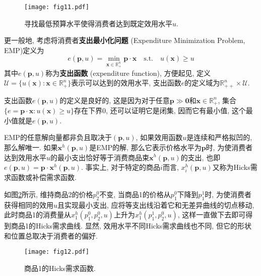 \documentclass[cn, 12pt, math=mtpro2, bibstyle=apa, blue, twocol]{elegantbook}
\newcommand{\R}{\mathbb{R}}
\newcommand{\p}{\mathbf{p}}
\newcommand{\x}{\mathbf{x}}
\begin{document}
\begin{figure}[htbp!]
  \centering
  \texttt{[image: fig11.pdf]}
  \caption{寻找最低预算水平使得消费者达到既定效用水平$u$.}\label{fig1.11}
\end{figure}

更一般地, 考虑将消费者\textbf{支出最小化问题} (Expenditure Minimization Problem, EMP)定义为
\begin{equation}\label{eq1.12}
  e(\p,u)=\min_{\x\in\R_+^n} \p\cdot\x\quad\text{s.t.}\quad u(\x)\ge u
\end{equation}
其中$e(\p,u)$称为\textbf{支出函数} (expenditure function), 方便起见, 定义$\mathcal{U}=\{u(\x):\x\in\R_+^n\}$表示可以达到的效用水平, 支出函数$e$的定义域为$\R_{++}^n\times\mathcal{U}$.

支出函数$e(\p,u)$的定义是良好的, 这是因为对于任意$\p\gg\mathbf{0}$和$\x\in\R_+^n$, 集合$\{e=\p\cdot\x: u(\x)\geq u\}$存在下界0, 还可以证明它是闭集, 因而它有最小值, 这个最小值就是$e(\p,u)$.

EMP的任意解向量都非负且取决于$(\p,u)$, 如果效用函数$u$是连续和严格拟凹的, 那么解唯一. 如果$\x^h(\p,u)$是EMP的解, 那么它表示价格水平为$\p$时, 为使消费者达到效用水平$u$的最小支出恰好等于消费商品束$\x^h(\p,u)$的支出, 也即$e(\p,u)=\p\cdot\x^h(\p,u)$. 事实上, 对于特定的商品$i$而言, $x_i^h(\p,u)$又称为Hicks需求函数或补偿需求函数.

如图\ref{fig1.12}所示, 维持商品2的价格$p_2^0$不变, 当商品1的价格从$p_1^0$下降到$p_1^1$时, 为使消费者获得相同的效用$u$且实现最小支出, 应将等支出线沿着它和无差异曲线的切点移动, 此时商品1的消费量从$x_1^h(p_1^0,p_2^0,u)$上升为$x_1^h(p_1^1,p_2^0,u)$, 这样一直做下去即可得到商品1的Hicks需求曲线. 显然, 效用水平不同Hicks需求曲线也不同, 但它的形状和位置总取决于消费者的偏好.
\begin{figure}[htbp!]
  \centering
  \texttt{[image: fig12.pdf]}
  \caption{商品1的Hicks需求函数.}\label{fig1.12}
\end{figure}
\end{document}
